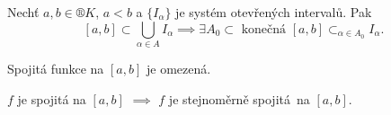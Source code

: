 \documentclass[12pt]{article}					%
\begin{document}
		\begin{dusledek}
			Nechť $a, b \in ®K$, $a < b$ a $\{I_\alpha\}$ je systém otevřených intervalů. Pak
			$$ [a, b] \subset \bigcup_{\alpha \in A}I_\alpha \implies \exists A_0 \subset \text{ konečná } [a, b] \subset_{\alpha \in A_0} I_\alpha. $$
		\end{dusledek}

		\begin{dusledek}
			Spojitá funkce na $[a, b]$ je omezená.
		\end{dusledek}

		\begin{dusledek}
			$f$ je spojitá na $[a, b]$ $\implies$ $f$ je stejnoměrně spojitá na $[a, b]$.
		\end{dusledek}
\end{document}
